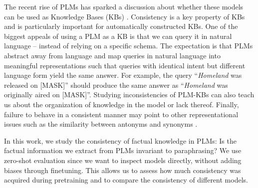 The recent rise of PLMs has sparked a discussion about whether these models can be used as Knowledge Bases (KBs) \cite{lama,petroni2020how,alpaqa,roberts2020much}. 
Consistency is a key property of KBs and is particularly important for automatically constructed KBs.
One of the biggest appeals of using a PLM as a KB is that we can
query it in natural language -- instead of relying on a specific schema.
The expectation is that PLMs abstract away from language and map queries in natural language into meaningful representations such that queries with identical intent but different language form yield the same answer. 
For example, the query ``\textit{Homeland} was released on [MASK]'' should produce the same answer as ``\textit{Homeland} was originally aired on [MASK]''.
Studying inconsistencies of PLM-KBs can also teach us about the organization of knowledge in the model or lack thereof. 
Finally, failure to behave in a consistent manner may point
to other representational issues
such as the similarity between antonyms and synonyms
\cite{nguyen2016integrating}.

In this work, we study the consistency of factual knowledge
in PLMs: Is the factual information we extract from PLMs
invariant to paraphrasing? We use zero-shot evaluation since
we want to inspect models directly, without adding biases
through finetuning. This allows us to assess how
much consistency was acquired during pretraining and to
compare the consistency of different models.




